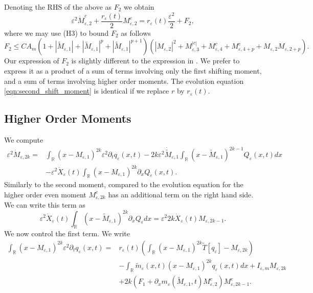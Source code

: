 \documentclass[]{article}
\theoremstyle{remark}
\begin{document}
Denoting the RHS of the above as $F_2$  we obtain 
\begin{equation}\label{eqn:second_shift_moment}\varepsilon^2\dot{{M}}_{\varepsilon,2}^c+\frac{r_\varepsilon(t)}{2}{M}_{\varepsilon,2}^c=r_\varepsilon(t)\frac{\varepsilon^2}{2}+F_2,
\end{equation}
where we may use (H3) to bound $F_2$ as follows
\begin{equation*}
  F_2\leq{}CA_m(1+|\widetilde{M}_{\varepsilon,1}|+|\widetilde{M}_{\varepsilon,1}|^p+|\widetilde{M}_{\varepsilon,1}|^{p+1})(|M_{\varepsilon,2}|^2+M_{\varepsilon,3}^{|c|}+M_{\varepsilon,4}^{c}+M_{\varepsilon,4+p}^{c}+M_{\varepsilon,2}M_{\varepsilon,2+p}).  
\end{equation*}
Our expression of $F_2$ is slightly different to the expression in \cite{GHM}. We prefer to express it as a product of a sum of terms involving only the first shifting moment, and a sum of terms involving higher order moments. The evolution equation \eqref{eqn:second_shift_moment} is identical if we replace $r$ by $r_\varepsilon(t)$.
\subsection{Higher Order Moments}  
We compute 
\begin{align*}
\varepsilon^2{}\dot{M}_{\varepsilon,2k}=&\int_{\mathbb{R}}(x-{M}_{\varepsilon,1})^{2k}\varepsilon^2\partial_t{}q_{\varepsilon}(x,t)-2k\varepsilon^2\dot{\widetilde{M}}_{\varepsilon,1}\int_\mathbb{R}(x-\widetilde{M}_{\varepsilon,1})^{2k-1}Q_\varepsilon(x,t)dx\\&-\varepsilon^2\dot{X}_\varepsilon(t)\int_{\mathbb{R}}(x-M_{\varepsilon,1})^{2k}\partial_{x}Q_\varepsilon(x,t).
\end{align*}
Similarly to the second moment, compared to \cite{GHM} the evolution equation for the higher order even moment  $M_{\varepsilon,2k}^c$ has an additional term on the right hand side.  We can write this term as
\[\varepsilon^2{}\dot{X}_\varepsilon(t)\int_{\mathbb{R}}(x-\widetilde{M}_{\varepsilon,1})^{2k}\partial_{x}Q_\varepsilon{}dx=\varepsilon^2{2k}\dot{X}_\varepsilon(t)M_{\varepsilon,2k-1}.\] 
We now control the first term. We write
\begin{align*}
    \int_{\mathbb{R}}(x-{M}_{\varepsilon,1})^{2k}\varepsilon^2\partial_t{}q_{\varepsilon}(x,t)=&r_\varepsilon(t)\left(\int_{\mathbb{R}}(x-M_{\varepsilon,1})^{2k}\tilde{T}[q_\varepsilon]-M_{\varepsilon,2k}\right)\\
    &-\int_{\mathbb{R}}\tilde{m}_\varepsilon(x,t)(x-M_{\varepsilon,1})^{2k}q_\varepsilon(x,t)dx+I_{\varepsilon,m}M_{\varepsilon,2k}\\
    &+2k(F_1+\partial_xm_\varepsilon(\widetilde{M}_{\varepsilon,1},t)M_{\varepsilon,2}^c)M_{\varepsilon,2k-1}^{c}.
\end{align*}
\end{document}
